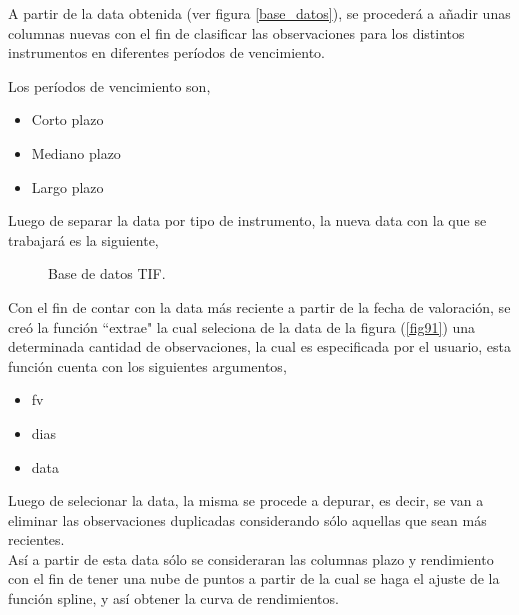 \hspace{0.4cm} A partir de la data obtenida (ver figura \ref{base_datos}), se proceder\'a a a\~nadir unas columnas nuevas con el fin de clasificar las observaciones para los distintos instrumentos en diferentes per\'iodos de vencimiento.

\noindent Los per\'iodos de vencimiento son,

\begin{itemize}
\item Corto plazo
\item Mediano plazo
\item Largo plazo
\end{itemize}

\hspace{0.4cm} Luego de separar la data por tipo de instrumento, la nueva data con la que se trabajar\'a es la siguiente,

\begin{figure}[h]
\caption{Base de datos TIF.}
\label{base_datos_tif}
\end{figure}

\hspace{0.4cm} Con el fin de contar con la data m\'as reciente a partir de la fecha de valoraci\'on, se cre\'o la funci\'on ``extrae" la cual seleciona de la data de la figura (\ref{fig91}) una determinada cantidad de observaciones, la cual es especificada por el usuario, esta funci\'on cuenta con los siguientes argumentos,

\begin{itemize}
 \item fv
 \item dias
 \item data
\end{itemize}

\hspace{0.4cm} Luego de selecionar la data, la misma se procede a depurar, es decir, se van a eliminar las observaciones duplicadas considerando s\'olo aquellas que sean m\'as recientes. \\


\hspace{0.4cm}As\'i a partir de esta data s\'olo se consideraran las columnas plazo y rendimiento con el fin de tener una nube de puntos a partir de la cual se haga el ajuste de la funci\'on spline, y as\'i obtener la curva de rendimientos.

